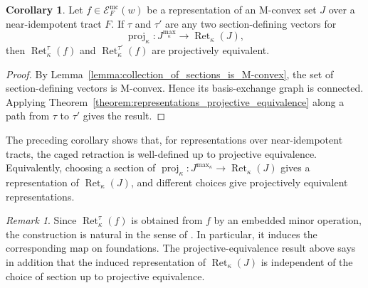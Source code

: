 \documentclass[11pt]{article}
\theoremstyle{definition}
\newtheorem{corollary}[theorem]{Corollary}
\theoremstyle{remark}
\newtheorem{remark}[theorem]{Remark}
\DeclareMathOperator{\proj}{proj}              %
\newcommand{\kproj}{\proj_{\kappa}}            %
\DeclareMathOperator{\Ret}{Ret}                %
\newcommand{\RetK}{\Ret_{\kappa}}              %
\newcommand{\Jmax}{J^{\max_{\kappa}}}
\begin{document}
\begin{corollary}\label{corollary:all_representation_sections_projectively_equiv}
    Let $f\in\mathcal{E}^{\mathrm{mc}}_F(w)$ be a representation of an M-convex set $J$ over a near-idempotent tract $F$. If $\tau$ and $\tau'$ are any two section-defining vectors for
    \[
        \kproj\colon\Jmax\to\RetK(J),
    \]
    then $\RetK^\tau(f)$ and $\RetK^{\tau'}(f)$ are projectively equivalent.
\end{corollary}

\begin{proof}
    By Lemma~\ref{lemma:collection_of_sections_is_M-convex}, the set of section-defining vectors is M-convex. Hence its basis-exchange graph is connected. Applying Theorem~\ref{theorem:representations_projective_equivalence} along a path from $\tau$ to $\tau'$ gives the result.
\end{proof}

The preceding corollary shows that, for representations over near-idempotent tracts, the caged retraction is well-defined up to projective equivalence. Equivalently, choosing a section of $\kproj\colon\Jmax\to\RetK(J)$ gives a representation of $\RetK(J)$, and different choices give projectively equivalent representations.

\begin{remark}
    Since $\RetK^\tau(f)$ is obtained from $f$ by an embedded minor operation, the construction is natural in the sense of \cite{baker2025representationtheorypolymatroids}. In particular, it induces the corresponding map on foundations. The projective-equivalence result above says in addition that the induced representation of $\RetK(J)$ is independent of the choice of section up to projective equivalence.
\end{remark}

\printbibliography
\end{document}
